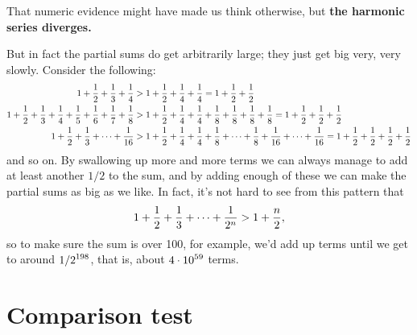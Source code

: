 That numeric evidence might have made us think otherwise, but
\textbf{the harmonic series diverges.}

But in fact the partial sums do get arbitrarily large; they just get
big very, very slowly. Consider the following:
\begin{align*}
\displaystyle 1+{1\over 2}+{1\over 3}+{1\over 4} &> 
1+{1\over 2}+{1\over 4}+{1\over
  4} = 1+{1\over 2}+{1\over 2} \\
\displaystyle 1+{1\over 2}+{1\over 3}+{1\over 4}+
{1\over 5}+{1\over 6}+{1\over
    7}+{1\over 8} &> 
1+{1\over 2}+{1\over 4}+{1\over 4}+{1\over 8}+{1\over 8}+{1\over
    8}+{1\over 8} = 1+{1\over 2}+{1\over 2}+{1\over 2} \\
\displaystyle 1+{1\over 2}+{1\over 3}+\cdots+{1\over16} &> 
1+{1\over 2}+{1\over 4}+{1\over 4}+{1\over 8}+\cdots+{1\over
  8}+{1\over16}+\cdots +{1\over16} =1+{1\over 2}+{1\over 2}+{1\over
  2}+{1\over 2} 
\end{align*}
\noindent
and so on. By swallowing up more and more terms we can always manage
to add at least another $1/2$ to the sum, and by adding enough of
these we can make the partial sums as big as we like. In fact, it's
not hard to see from this pattern that
$$1+{1\over 2}+{1\over 3}+\cdots+{1\over 2^n} > 1+{n\over 2},$$
so to make sure the sum is over 100, for example, we'd add
up terms until we get to around $\displaystyle 1/2^{198}$, that is,
about $\displaystyle 4\cdot 10^{59}$ terms.


\section{Comparison test}
\label{section:comparison-test}



